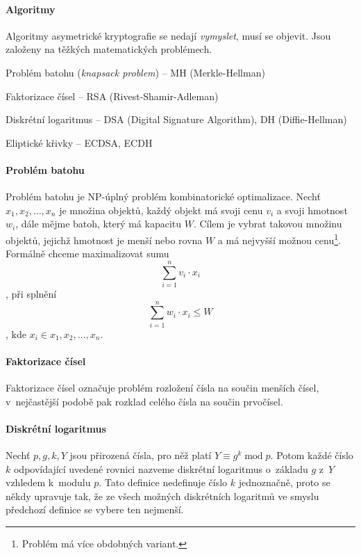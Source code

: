 \paragraph*{Algoritmy} Algoritmy asymetrické kryptografie se nedají \textit{vymyslet}, musí se objevit. Jsou založeny na těžkých matematických problémech. \begin{compactitem}
    \item Problém batohu (\textit{knapsack problem}) -- MH (Merkle-Hellman)
    \item Faktorizace čísel -- RSA (Rivest-Shamir-Adleman)
    \item Diskrétní logaritmus -- DSA (Digital Signature Algorithm), DH (Diffie-Hellman)
    \item Eliptické křivky -- ECDSA, ECDH
\end{compactitem}

\paragraph*{Problém batohu} Problém batohu je NP-úplný problém kombinatorické optimalizace. Nechť ${x_1, x_2, \dots, x_n}$ je množina objektů, každý objekt má svoji cenu $v_i$ a svoji hmotnost $w_i$, dále mějme batoh, který má kapacitu $W$. Cílem je vybrat takovou množinu objektů, jejichž hmotnost je menší nebo rovna $W$ a má nejvyšší možnou cenu\footnote{Problém má více obdobných variant.}. Formálně chceme maximalizovat sumu $$ \sum_{i=1}^n v_i \cdot x_i $$, při splnění $$ \sum_{i=1}^n w_i \cdot x_i \leq W $$, kde $x_i \in {x_1, x_2, \dots, x_n}$.

\paragraph*{Faktorizace čísel} Faktorizace čísel označuje problém rozložení čísla na součin menších čísel, v~nejčastější podobě pak rozklad celého čísla na součin prvočísel.

\paragraph*{Diskrétní logaritmus} Nechť $p, g, k, Y$ jsou přirozená čísla, pro něž platí $Y \equiv g^{k} \; \text{mod} \; p$. Potom každé číslo $k$ odpovídající uvedené rovnici nazveme diskrétní logaritmus o~základu $g$ z~$Y$ vzhledem k~modulu $p$. Tato definice nedefinuje číslo $k$ jednoznačně, proto se někdy upravuje tak, že ze všech možných diskrétních logaritmů ve smyslu předchozí definice se vybere ten nejmenší.

